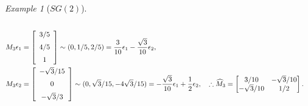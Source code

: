 \documentclass[a4paper]{amsart}
\theoremstyle{plain}
\theoremstyle{definition}
\theoremstyle{remark}
\newtheorem{example}[theorem]{Example}
\begin{document}
\begin{example}[$ SG(2) $]
\begin{align*}
\\
M_3 \epsilon_1  &= 
 \left[ \begin {array}{c} 3/5\\\noalign{\medskip}4/5
\\\noalign{\medskip}1\end {array} \right] 
\sim (0,1/5,2/5) = \frac{3}{10}\epsilon_1 - \frac{\sqrt{3}}{10} \epsilon_2, 
\\
M_3 \epsilon_2  &= 
 \left[ \begin {array}{c} -\sqrt {3}/15\\\noalign{\medskip}0
\\\noalign{\medskip}-\sqrt {3}/3 \end {array} \right]
\sim (0,\sqrt{3}/15, -4\sqrt{3}/15) = -\frac{\sqrt{3}}{10} \epsilon_1 + \frac{1}{2} \epsilon_2 ,
\quad 
\therefore \widehat{M}_3  = \begin{bmatrix} 3/10 & -\sqrt{3}/10 \\ -\sqrt{3}/10  & 1/2 \end{bmatrix}.
\end{align*} 

\end{example} 
\end{document}
